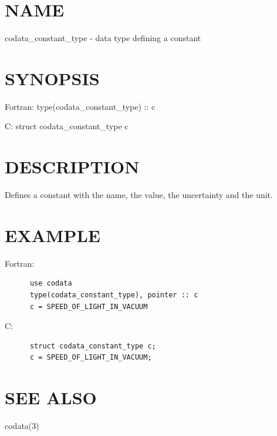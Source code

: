 \section*{NAME}
codata\_constant\_type - data type defining a constant

\section*{SYNOPSIS}
{\ttfamily
Fortran: type(codata\_constant\_type) :: c

C: struct codata\_constant\_type c

}
\section*{DESCRIPTION}
Defines a constant with the name, the value, the uncertainty and the unit.

\section*{EXAMPLE}
Fortran:

\begin{verbatim}
      use codata
      type(codata_constant_type), pointer :: c
      c = SPEED_OF_LIGHT_IN_VACUUM

\end{verbatim}
C:

\begin{verbatim}
      struct codata_constant_type c;
      c = SPEED_OF_LIGHT_IN_VACUUM;

\end{verbatim}
\section*{SEE ALSO}
codata(3)
